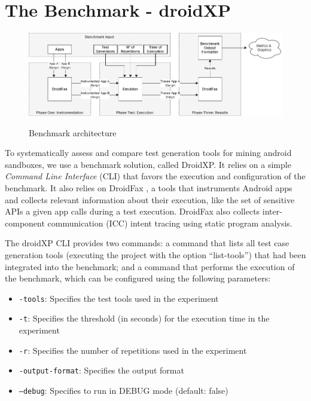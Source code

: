 \section{The Benchmark - droidXP}

\begin{figure}[ht]
  \includegraphics[width=1\textwidth]{images/benchmark3.png}
  \label{benchArq}
  \caption{Benchmark architecture}
  \label{fig:benchArq}
\end{figure}


To systematically assess and compare test generation tools for mining android sandboxes, we use a benchmark solution, called DroidXP. It relies on a simple \emph{Command Line Interface} (CLI) that favors the execution and configuration of the benchmark. It also
relies on DroidFax \cite{cai2016understanding}, a tools that instruments Android apps and collects relevant information about their execution, like the set of sensitive APIs a given
app calls during a test execution. DroidFax also collects inter-component communication (ICC)  intent  tracing  using  static  program analysis.

The droidXP CLI provides two commands: a command that lists all test case
generation tools (executing the project with the option ``list-tools'') that had been
integrated into the benchmark; and a command that performs the execution of the benchmark,
which can be configured using the following parameters:

\begin{itemize}
    \item \texttt{-tools}: Specifies the test tools used in the experiment
    \item \texttt{-t}: Specifies the threshold (in seconds) for the execution time in the experiment
    \item \texttt{-r}: Specifies the number of repetitions used in the experiment
    \item \texttt{-output-format}: Specifies the output format
    \item \texttt{--debug}: Specifies to run in DEBUG mode (default: false)    
\end{itemize}

